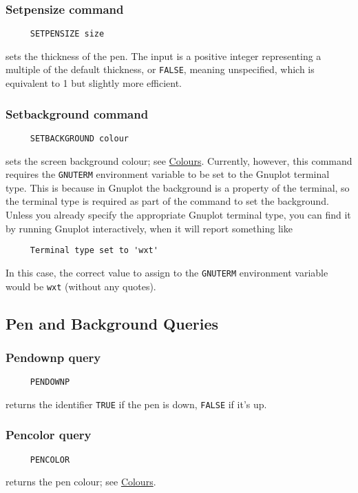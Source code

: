 \subsubsection*{Setpensize command}
\begin{verbatim}
     SETPENSIZE size
\end{verbatim}
sets the thickness of the pen.  The input is a positive integer
representing a multiple of the default thickness, or \texttt{FALSE},
meaning unspecified, which is equivalent to 1 but slightly
more efficient.

\subsubsection*{Setbackground command}
\begin{verbatim}
     SETBACKGROUND colour
\end{verbatim}
sets the screen background colour; see
\hyperref[logoturtle:Colours]{Colours}.  Currently, however, this
command requires the \texttt{GNUTERM} environment variable to be set
to the Gnuplot terminal type.  This is because in Gnuplot the
background is a property of the terminal, so the terminal type is
required as part of the command to set the background.  Unless you
already specify the appropriate Gnuplot terminal type, you can find it
by running Gnuplot interactively, when it will report something like
\begin{verbatim}
     Terminal type set to 'wxt'
\end{verbatim}
In this case, the correct value to assign to the \texttt{GNUTERM}
environment variable would be \texttt{wxt} (without any quotes).


\subsection{Pen and Background Queries}

\subsubsection*{Pendownp query}
\begin{verbatim}
     PENDOWNP
\end{verbatim}
returns the identifier \texttt{TRUE} if the pen is down,
\texttt{FALSE} if it's up.

\subsubsection*{Pencolor query}
\begin{verbatim}
     PENCOLOR
\end{verbatim}
\label{logoturtle:pencolor}
returns the pen colour; see \hyperref[logoturtle:Colours]{Colours}.

